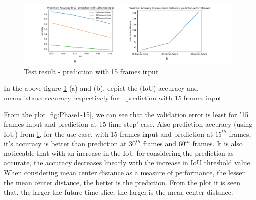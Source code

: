 \begin{figure}[H] 
\includegraphics[scale=0.6]{Phase1-accuracy}
\begin{center}
\caption{Test result - prediction with 15 frames input}
\label{Phase1-accuracy}
\end{center}
\end{figure}

In the above figure \ref{Phase1-accuracy} (a) and (b), depict the (IoU) accuracy and mean\textunderscore distance\textunderscore accuracy respectively for - prediction with 15 frames input.



From the plot \ref{fig:Phase1-15}, we can see that the validation error is least for '15 frames input and prediction at 15-time step' case. Also prediction accuracy (using IoU) from \ref{Phase1-accuracy}, for the use case, with 15 frames input and prediction at $15^{th}$ frames, it's accuracy is better than prediction at $30^{th}$ frames and $60^{th}$ frames. It is also noticeable that with an increase in the IoU for considering the prediction as accurate, the accuracy decreases linearly with the increase in IoU threshold value. When considering mean center distance as a measure of performance, the lesser the mean center distance, the better is the prediction. From the plot it is seen that, the larger the future time slice, the larger is the mean center distance.

